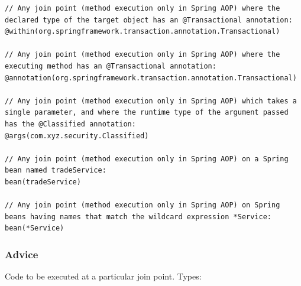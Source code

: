\documentclass{scrartcl}
\begin{document}
\begin{lstlisting}
// Any join point (method execution only in Spring AOP) where the declared type of the target object has an @Transactional annotation:
@within(org.springframework.transaction.annotation.Transactional)

// Any join point (method execution only in Spring AOP) where the executing method has an @Transactional annotation:
@annotation(org.springframework.transaction.annotation.Transactional)

// Any join point (method execution only in Spring AOP) which takes a single parameter, and where the runtime type of the argument passed has the @Classified annotation:
@args(com.xyz.security.Classified)

// Any join point (method execution only in Spring AOP) on a Spring bean named tradeService:
bean(tradeService)

// Any join point (method execution only in Spring AOP) on Spring beans having names that match the wildcard expression *Service:
bean(*Service)
\end{lstlisting}

\subsubsection{Advice}


Code to be executed at a particular join point.
Types:
\end{document}
